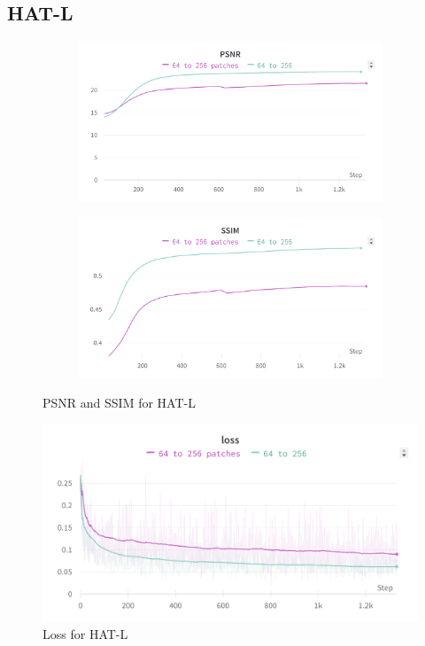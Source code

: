 \subsection{HAT-L}
\label{subsec:training_hatl}
\begin{figure}[H]
  \centering
  \begin{subfigure}{.5\textwidth}
    \centering
    \includegraphics[width=1\linewidth]{figures/HATL_PSNR.png}
    \label{fig:hatl_psnr}
  \end{subfigure}%
  \begin{subfigure}{.5\textwidth}
    \centering
    \includegraphics[width=1\linewidth]{figures/HATL_SSIM.png}
    \label{fig:hatl_ssim}
  \end{subfigure}
  \caption{PSNR and SSIM for HAT-L}
  \label{fig:hatl_metrics}
\end{figure}

\begin{figure}[H]
  \centering
  \includegraphics[scale=0.14]{figures/HATL_loss.png}
  \caption{Loss for HAT-L}
  \label{img:hatl_loss}
\end{figure}
